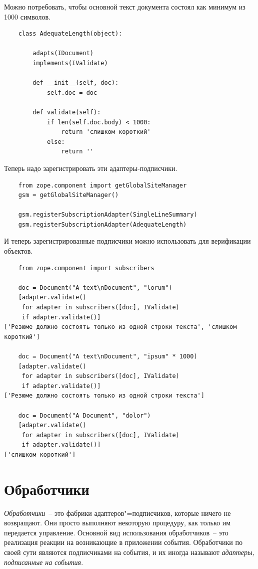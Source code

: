 \documentclass[a4paper,openany,twoside,final]{book}
\providecommand*{\DUroletitlereference}[1]{\textsl{#1}}
\begin{document}
Можно потребовать, чтобы основной текст документа состоял как минимум
из 1000 символов.

\begin{verbatim}
    class AdequateLength(object):

        adapts(IDocument)
        implements(IValidate)

        def __init__(self, doc):
            self.doc = doc

        def validate(self):
            if len(self.doc.body) < 1000:
                return 'слишком короткий'
            else:
                return ''
\end{verbatim}

Теперь надо зарегистрировать эти адаптеры-подписчики.

\begin{verbatim}
    from zope.component import getGlobalSiteManager
    gsm = getGlobalSiteManager()

    gsm.registerSubscriptionAdapter(SingleLineSummary)
    gsm.registerSubscriptionAdapter(AdequateLength)
\end{verbatim}

И теперь зарегистрированные подписчики можно использовать для верификации объектов.

\begin{verbatim}
    from zope.component import subscribers

    doc = Document("A text\nDocument", "lorum")
    [adapter.validate()
     for adapter in subscribers([doc], IValidate)
     if adapter.validate()]
['Резюме должно состоять только из одной строки текста', 'слишком короткий']

    doc = Document("A text\nDocument", "ipsum" * 1000)
    [adapter.validate()
     for adapter in subscribers([doc], IValidate)
     if adapter.validate()]
['Резюме должно состоять только из одной строки текста']

    doc = Document("A Document", "dolor")
    [adapter.validate()
     for adapter in subscribers([doc], IValidate)
     if adapter.validate()]
['слишком короткий']
\end{verbatim}


\section{Обработчики%
  \label{id47}%
}

\DUroletitlereference{Обработчики}~-- это фабрики адаптеров"=подписчиков, которые ничего не возвращают.  Они просто выполняют некоторую процедуру, как только им передается управление.  Основной вид использования обработчиков~-- это реализация реакции на возникающие в приложении события.  Обработчики по своей сути являются подписчиками на события, и их иногда называют \DUroletitlereference{адаптеры, подписанные на события}.
\end{document}
